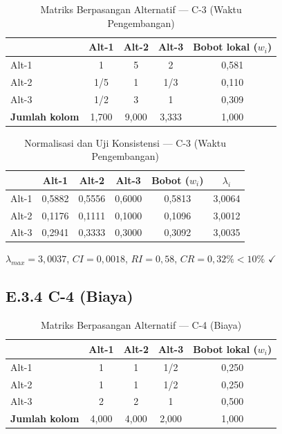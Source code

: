 \begin{table}[H]
  \caption{Matriks Berpasangan Alternatif --- C-3 (Waktu Pengembangan)}
  \label{tab:matriks-c3}
  \centering
  \begin{tabular}{| l | c | c | c | c |}
    \hline
    & \textbf{Alt-1} & \textbf{Alt-2} & \textbf{Alt-3} & \textbf{Bobot lokal ($w_i$)} \\
    \hline
    Alt-1 & 1   & 5 & 2   & 0,581 \\
    \hline
    Alt-2 & 1/5 & 1 & 1/3 & 0,110 \\
    \hline
    Alt-3 & 1/2 & 3 & 1   & 0,309 \\
    \hline
    \textbf{Jumlah kolom} & 1,700 & 9,000 & 3,333 & 1,000 \\
    \hline
  \end{tabular}
\end{table}

\begin{table}[H]
  \caption{Normalisasi dan Uji Konsistensi --- C-3 (Waktu Pengembangan)}
  \label{tab:norm-c3}
  \centering
  \begin{tabular}{| l | c | c | c | c | c |}
    \hline
    & \textbf{Alt-1} & \textbf{Alt-2} & \textbf{Alt-3} & \textbf{Bobot ($w_i$)} & \textbf{$\lambda_i$} \\
    \hline
    Alt-1 & 0,5882 & 0,5556 & 0,6000 & 0,5813 & 3,0064 \\
    \hline
    Alt-2 & 0,1176 & 0,1111 & 0,1000 & 0,1096 & 3,0012 \\
    \hline
    Alt-3 & 0,2941 & 0,3333 & 0,3000 & 0,3092 & 3,0035 \\
    \hline
  \end{tabular}
\end{table}

$\lambda_{max} = 3{,}0037$, $CI = 0{,}0018$, $RI = 0{,}58$, $CR = 0{,}32\% < 10\%$ $\checkmark$

\subsection*{E.3.4 C-4 (Biaya)}

\begin{table}[H]
  \caption{Matriks Berpasangan Alternatif --- C-4 (Biaya)}
  \label{tab:matriks-c4}
  \centering
  \begin{tabular}{| l | c | c | c | c |}
    \hline
    & \textbf{Alt-1} & \textbf{Alt-2} & \textbf{Alt-3} & \textbf{Bobot lokal ($w_i$)} \\
    \hline
    Alt-1 & 1 & 1   & 1/2 & 0,250 \\
    \hline
    Alt-2 & 1 & 1   & 1/2 & 0,250 \\
    \hline
    Alt-3 & 2 & 2   & 1   & 0,500 \\
    \hline
    \textbf{Jumlah kolom} & 4,000 & 4,000 & 2,000 & 1,000 \\
    \hline
  \end{tabular}
\end{table}

